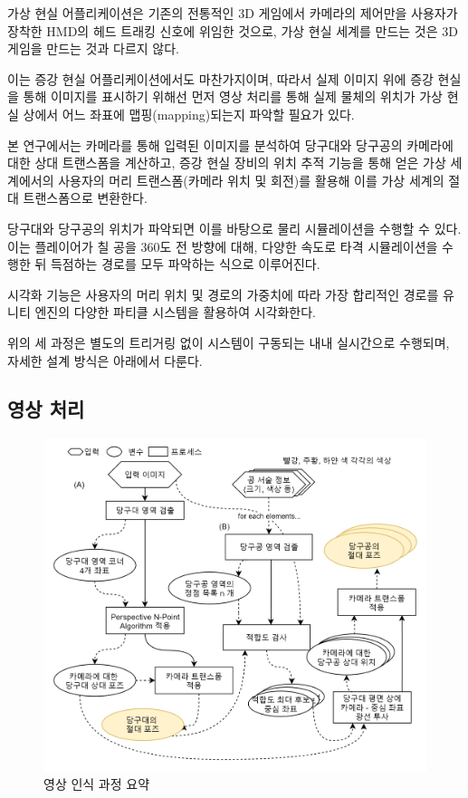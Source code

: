 \documentclass[10pt]{oblivoir}
\begin{document}
가상 현실 어플리케이션은 기존의 전통적인 3D 게임에서 카메라의 제어만을 사용자가 장착한 HMD의 헤드 트래킹 신호에 위임한 것으로, 가상 현실 세계를 만드는 것은 3D 게임을 만드는 것과 다르지 않다.

이는 증강 현실 어플리케이션에서도 마찬가지이며, 따라서 실제 이미지 위에 증강 현실을 통해 이미지를 표시하기 위해선 먼저 영상 처리를 통해 실제 물체의 위치가 가상 현실 상에서 어느 좌표에 맵핑(mapping)되는지 파악할 필요가 있다.

본 연구에서는 카메라를 통해 입력된 이미지를 분석하여 당구대와 당구공의 카메라에 대한 상대 트랜스폼을 계산하고, 증강 현실 장비의 위치 추적 기능을 통해 얻은 가상 세계에서의 사용자의 머리 트랜스폼(카메라 위치 및 회전)를 활용해 이를 가상 세계의 절대 트랜스폼으로 변환한다.

당구대와 당구공의 위치가 파악되면 이를 바탕으로 물리 시뮬레이션을 수행할 수 있다. 이는 플레이어가 칠 공을 360도 전 방향에 대해, 다양한 속도로 타격 시뮬레이션을 수행한 뒤 득점하는 경로를 모두 파악하는 식으로 이루어진다.

시각화 기능은 사용자의 머리 위치 및 경로의 가중치에 따라 가장 합리적인 경로를 유니티 엔진의 다양한 파티클 시스템을 활용하여 시각화한다. 

위의 세 과정은 별도의 트리거링 없이 시스템이 구동되는 내내 실시간으로 수행되며, 자세한 설계 방식은 아래에서 다룬다.

\subsection{영상 처리}
\begin{figure}
    \centering
    \includegraphics[width=16cm]{img/recognition-diagram.png}
    \caption{영상 인식 과정 요약}
    \label{fig;recognition-flowchart}
\end{figure}
\end{document}
